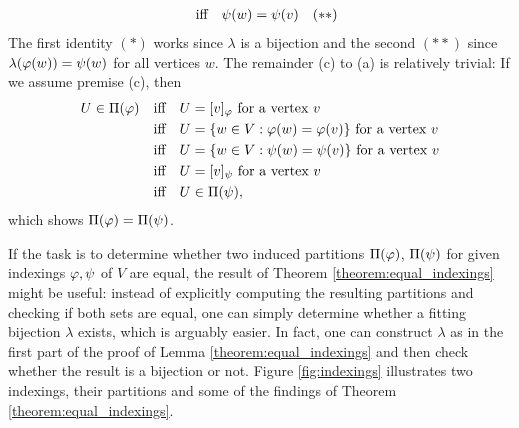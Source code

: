\begin{\appendixproof}
\begin{align*}
        &\quad\text{iff}\quad \psi(w) = \psi(v) &(**)
    \end{align*}
    The first identity $(*)$ works since $\lambda$ is a bijection and the second $(**)$ since $\lambda(\varphi(w))=\psi(w)$ for all vertices $w$.
    The remainder (c) to (a) is relatively trivial: If we assume premise (c), then
    \begin{align*}
        U \in \Pi(\varphi) &\quad\text{iff}\quad U = [v]_\varphi \text{ for a vertex $v$} \\
        &\quad\text{iff}\quad U = \{ w \in V : \varphi(w) = \varphi(v) \} \text{ for a vertex $v$} \\
        &\quad\text{iff}\quad U = \{ w \in V : \psi(w) = \psi(v) \} \text{ for a vertex $v$} \\ 
        &\quad\text{iff}\quad U = [v]_{\psi} \text{ for a vertex $v$} \\
        &\quad\text{iff}\quad U \in \Pi(\psi),
    \end{align*}
    which shows $\Pi(\varphi)=\Pi(\psi)$.
\end{\appendixproof}

If the task is to determine whether two induced partitions $\Pi(\varphi)$, $\Pi(\psi)$ for given indexings $\varphi,\psi$ of $V$ are equal, the result of Theorem \ref{theorem:equal_indexings} might be useful: instead of explicitly computing the resulting partitions and checking if both sets are equal, one can simply determine whether a fitting bijection $\lambda$ exists, which is arguably easier. In fact, one can construct $\lambda$ as in the first part of the proof of Lemma \ref{theorem:equal_indexings} and then check whether the result is a bijection or not. Figure \ref{fig:indexings} illustrates two indexings, their partitions and some of the findings of Theorem \ref{theorem:equal_indexings}.